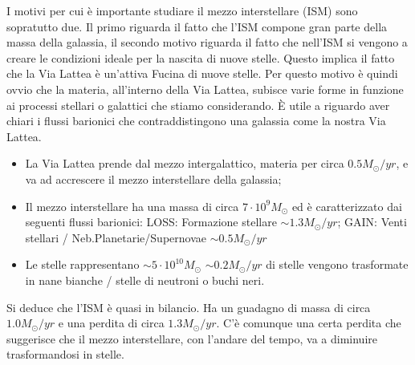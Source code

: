I motivi per cui \`e importante studiare il mezzo interstellare (ISM) sono sopratutto due. Il primo riguarda il fatto che l'ISM compone gran parte della massa della galassia, il secondo motivo riguarda il fatto che nell'ISM si vengono a creare le condizioni ideale per la nascita di nuove stelle.
Questo implica il fatto che la Via Lattea \`e un'attiva Fucina di nuove stelle. Per questo motivo \`e quindi ovvio che la materia, all'interno della Via Lattea, subisce varie forme in funzione ai processi stellari o galattici che stiamo considerando. \`E utile a riguardo aver chiari i flussi barionici che contraddistingono una galassia come la nostra Via Lattea.
\begin{itemize}
		\item La Via Lattea prende dal mezzo intergalattico, materia per circa $0.5 M_{\odot}/yr$, e va ad accrescere il mezzo interstellare della galassia;
		\item Il mezzo interstellare ha una massa di circa $7\cdot 10^9 M_{\odot}$ ed \`e caratterizzato dai seguenti flussi barionici:
				\subitem LOSS: Formazione stellare $\sim 1.3 M_{\odot}/yr$;
				\subitem GAIN: Venti stellari / Neb.Planetarie/Supernovae $\sim 0.5 M_{\odot}/yr$
		\item Le stelle rappresentano $\sim 5\cdot 10^{10}M_{\odot}$
				\subitem $\sim 0.2 M_{\odot}/yr$ di stelle vengono trasformate in nane bianche / stelle di neutroni o buchi neri.
\end{itemize}
Si deduce che l'ISM \`e quasi in bilancio. Ha un guadagno di massa di circa $1.0 M_{\odot}/yr$ e una perdita di circa $1.3 M_{\odot}/yr$. C'\`e comunque una certa perdita che suggerisce che il mezzo interstellare, con l'andare del tempo, va a diminuire trasformandosi in stelle.










